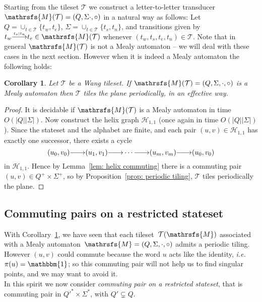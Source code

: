 \documentclass{amsart}
\newtheorem{corollary}[theorem]{Corollary}
\begin{document}
Starting from the tileset $\mathcal{T}$ we construct a letter-to-letter transducer ${{{\mathrsfs{{M}}}}}(\mathcal{T})= ({{{Q}}},{{{\Sigma}}}{{{\cdot}}},{{{\circ}}})$ in a natural way as follows: Let ${{{Q}}}=\cup_{t\in\mathcal{T}}\{t_{w},t_{e}\}$,  ${{{\Sigma}}}=\cup_{t\in\mathcal{T}}\{t_{s},t_{n}\}$, and transitions given by $t_w{\smash{\stackrel{\text{\tiny{${t_s|t_n}$}}}{\relbar\joinrel\longrightarrow}}}t_e \in {{{\mathrsfs{{M}}}}}(\mathcal{T}) $ whenever $(t_w,t_s,t_e,t_n)\in\mathcal{T}$. Note that in general ${{{\mathrsfs{{M}}}}}(\mathcal{T})$ is not a Mealy automaton -- we will deal with these cases in the next section. However when it is indeed a Mealy automaton the following holds:

\begin{corollary}\label{cor:period-decid}
Let $\mathcal{T}$ be a Wang tileset. If  ${{{\mathrsfs{{M}}}}}(\mathcal{T})=({{{Q}}},{{{\Sigma}}},{{{\cdot}}},{{{\circ}}})$ is a Mealy automaton then $\mathcal{T}$ tiles the plane periodically, in an effective way.
\end{corollary}
\begin{proof}
It is decidable if ${{{\mathrsfs{{M}}}}}(\mathcal{T})$ is a Mealy automaton in time $O( {|{{{Q}}}|}{|{{{\Sigma}}}|} )$. Now construct the helix graph  $\mathcal{H}_{1,1}$ (once again  in time $O( {|{{{Q}}}|}{|{{{\Sigma}}}|} )$).  Since the stateset and the alphabet are finite, and each pair $(u,v) \in \mathcal{H}_{1,1} $ has exactly one successor, there exists a cycle 
\[
(u_{0},v_{0}){\smash{\stackrel{\text{\tiny{${}$}}}{\relbar\joinrel\longrightarrow}}}(u_{1},v_{1}){\smash{\stackrel{\text{\tiny{${}$}}}{\relbar\joinrel\longrightarrow}}}\cdots {\smash{\stackrel{\text{\tiny{${}$}}}{\relbar\joinrel\longrightarrow}}}(u_{m},v_{m}){\smash{\stackrel{\text{\tiny{${}$}}}{\relbar\joinrel\longrightarrow}}}(u_{0},v_{0})
\]
in $\mathcal{H}_{1,1}$. Hence by Lemma~\ref{lem: helix commuting} there is a commuting pair $(u,v) \in {{{Q}}}^{+} \times {{{\Sigma}}}^{+}$, so by Proposition~\ref{prop: periodic tiling}, $\mathcal{T}$ tiles periodically the plane.
\end{proof}
\subsection{Commuting pairs on a restricted stateset}
With Corollary~\ref{cor:period-decid}, we have seen that  each tileset~$\mathcal{T}({{{\mathrsfs{{M}}}}})$ associated with a Mealy automaton~${{{\mathrsfs{{M}}}}}=({{{Q}}},{{{\Sigma}}},{{{\cdot}}},{{{\circ}}})$ admits a periodic tiling. However $(u,v)$ could commute because the word $u$ acts like the identity, \emph{i.e.} $\pi(u)=\operatorname{\mathbbm{1}}$; so this commuting pair will not help us to find singular points, and we may want to avoid it.\\
In this spirit we now consider \emph{commuting pair on a restricted stateset}, that is commuting pair in ${{{Q}}}'^*\times {{{\Sigma}}}^*$, with ${{{Q}}}'\varsubsetneq {{{Q}}}$. \medskip
\end{document}
